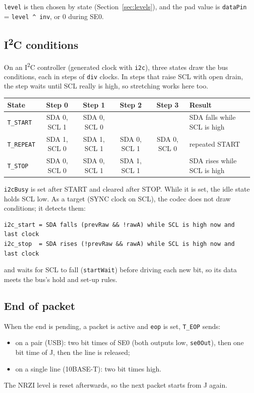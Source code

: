 \documentclass[11pt,a4paper]{article}
\newcommand{\sig}[1]{\texttt{#1}}
\begin{document}
\sig{level} is then chosen by state (Section~\ref{sec:levels}), and the pad value is \sig{dataPin} = \sig{level \^{} inv}, or 0 during SE0.

\subsection{I\textsuperscript{2}C conditions}

On an I\textsuperscript{2}C controller (generated clock with \sig{i2c}), three states draw the bus conditions, each in steps of \sig{div} clocks. In steps that raise SCL with open drain, the step waits until SCL really is high, so stretching works here too.

\begin{center}
{\small\begin{tabular}{@{}l c c c c l@{}}
\toprule
State & Step 0 & Step 1 & Step 2 & Step 3 & Result \\
\midrule
\sig{T\_START} & SDA 0, SCL 1 & SDA 0, SCL 0 & & & SDA falls while SCL is high \\
\sig{T\_REPEAT} & SDA 1, SCL 0 & SDA 1, SCL 1 & SDA 0, SCL 1 & SDA 0, SCL 0 & repeated START \\
\sig{T\_STOP} & SDA 0, SCL 0 & SDA 0, SCL 1 & SDA 1, SCL 1 & & SDA rises while SCL is high \\
\bottomrule
\end{tabular}}
\end{center}

\sig{i2cBusy} is set after START and cleared after STOP. While it is set, the idle state holds SCL low. As a target (SYNC clock on SCL), the codec does not draw conditions; it detects them:

\begin{lstlisting}
i2c_start = SDA falls (prevRaw && !rawA) while SCL is high now and last clock
i2c_stop  = SDA rises (!prevRaw && rawA) while SCL is high now and last clock
\end{lstlisting}
and waits for SCL to fall (\sig{startWait}) before driving each new bit, so its data meets the bus's hold and set-up rules.

\subsection{End of packet}

When the end is pending, a packet is active and \sig{eop} is set, \sig{T\_EOP} sends:
\begin{itemize}
\item on a pair (USB): two bit times of SE0 (both outputs low, \sig{se0Out}), then one bit time of J, then the line is released;
\item on a single line (10BASE-T): two bit times high.
\end{itemize}
The NRZI level is reset afterwards, so the next packet starts from J again.
\end{document}
